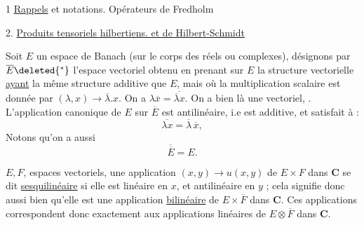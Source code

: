 1 \uline{Rappels}  et notations. Opérateurs de Fredholm

2. \uline{Produits tensoriels hilbertiens.  et de Hilbert-Schmidt}

Soit $E$ un espace de Banach (sur le corps des réels ou complexes), désignons par $\overline E\deleted{{}^*}$ l'espace  vectoriel obtenu en prenant sur $E$ la structure vectorielle \uline{ayant} la même structure additive que $E$, mais où la multiplication scalaire est donnée par $(\lambda,x)\longrightarrow\overline\lambda.x$.
On a $\lambda\overline x=\overline{\overline\lambda x}$.
On a bien là une   vectoriel, .
L'application canonique  de $E$ sur $\overline E$ est antilinéaire, i.e est additive, et satisfait à :
\[
\overline{\lambda x}=\overline\lambda\,\overline x,
\]
Notons qu'on a aussi
\[
\overline{\overline E}=E.
\]


$E,F$,   espaces vectoriels, une application $(x,y)\longrightarrow u(x,y)$  de $E\times F$  dans $\mathbf C$ se dit \uline{sesquilinéaire} si elle est linéaire en $x$, et antilinéaire en $y$ ; cela signifie donc aussi bien qu'elle est une application \uline{bilinéaire} de $E\times\overline F$ dans $\mathbf C$. Ces applications correspondent donc exactement aux applications linéaires de $E\otimes\overline F$ dans $\mathbf C$.

